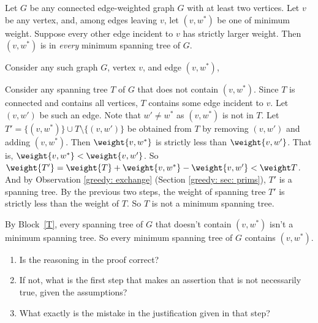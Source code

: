 \documentclass[11pt]{article}
\begin{document}
\begin{conjecture}
  Let $G$ be any connected edge-weighted graph $G$ with at least two vertices.
  Let $v$ be any vertex,
  and, among edges leaving $v$,
  let $(v, w^*)$ be one of minimum weight.
  Suppose every other edge incident to $v$ has strictly larger weight.
  Then $(v,w^*)$ is in \emph{every} minimum spanning tree of $G$.
\end{conjecture}
\begin{longFormProof}
  \step Consider any such graph $G$, vertex $v$, and edge $(v,w^*)$,
  \begin{block}[T]
    \step Consider any spanning tree $T$ of $G$ that does not contain $(v,w^*)$.
    \step Since $T$ is connected and contains all vertices, $T$ contains some edge incident to $v$.
    \step Let $(v, w')$ be such an edge.  Note that $w' \ne w^*$ as $(v, w^*)$ is not in $T$.
    \step Let $T' = \{(v, w^*)\} \cup T \setminus \{(v, w')\}$ be obtained from $T$ by removing $(v, w')$ and adding $(v, w^*)$.
    \step Then $\weight{v, w^*}$ is strictly less than $\weight{v, w'}$.  That is, $\weight{v, w^*} < \weight{v, w'}$.  
    \step So $\weight{T'} = \weight{T} + \weight{v, w^*} - \weight{v, w'} < \weight T$.
    \step And by Observation \ref{greedy: exchange} (Section \ref{greedy: sec: prims}), $T'$ is a spanning tree.
    \step By the previous two steps, the weight of spanning tree $T'$ is strictly less than the weight of $T$. 
    \step So $T$ is not a minimum spanning tree.
  \end{block}
  \step By Block~\ref{T}, every spanning tree of $G$ that doesn't contain $(v, w^*)$ isn't a minimum spanning tree. 
  \step So every minimum spanning tree of $G$ contains $(v, w^*)$.
\end{longFormProof}

\begin{enumerate}[label=(\alph*)]
\item Is the reasoning in the proof correct?  

\item
  If not, what is the first step that makes an assertion that is not necessarily true,
  given the assumptions?

\item
  What exactly is the mistake in the justification given in that step?
\end{enumerate}

\continued

\setlength{\ITEMHT}{1.5in}
{\injectEnumerate
{}
}
\end{document}
